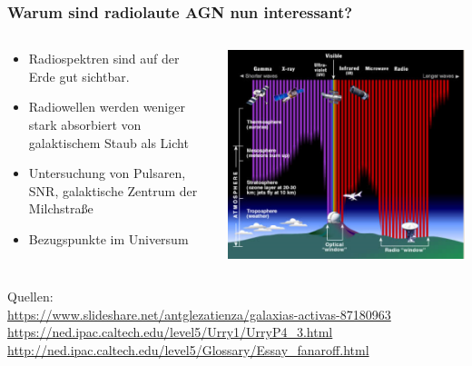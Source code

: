 \documentclass[aspectratio=1610, 9pt]{beamer}
\begin{document}
\begin{frame}\frametitle{Warum sind radiolaute AGN nun interessant?}
  \begin{columns}
  \begin{column}[c]{0.45\textwidth}
  \begin{itemize}
    \item Radiospektren sind auf der Erde gut sichtbar.
    \item Radiowellen werden weniger stark absorbiert von galaktischem Staub als Licht
    \item Untersuchung von Pulsaren, SNR, galaktische Zentrum der Milchstra\ss e
    \item Bezugspunkte im Universum
  \end{itemize}
  \end{column}
  \begin{column}[c]{0.45\textwidth}
    \includegraphics{images/durchlaessigkeit.png}
  \end{column}
  \end{columns}
\end{frame}

\begin{frame}
Quellen: \\
\url{https://www.slideshare.net/antglezatienza/galaxias-activas-87180963} \\
\url{https://ned.ipac.caltech.edu/level5/Urry1/UrryP4_3.html} \\
\url{http://ned.ipac.caltech.edu/level5/Glossary/Essay_fanaroff.html} \\

\end{frame}
\end{document}
